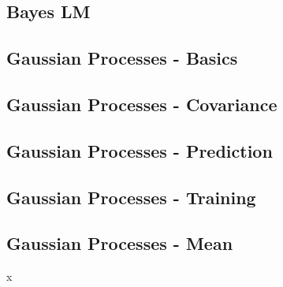 

\subsection{Bayes LM}


\subsection{Gaussian Processes - Basics}

\subsection{Gaussian Processes - Covariance}

\subsection{Gaussian Processes - Prediction}

\subsection{Gaussian Processes - Training}

\subsection{Gaussian Processes - Mean}

x